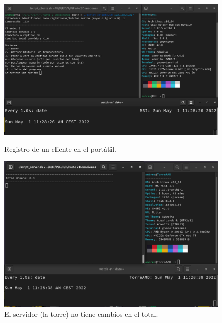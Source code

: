 \documentclass{article}
\begin{document}
\begin{figure}[H]
    \centering
    \begin{minipage}[H]{0.49\textwidth}
        \centering
        \includegraphics[width=\textwidth]{imagenes/multiples ordenadores/Cliente/Screenshot from 2022-05-01 11-29-01.png}
        \caption{Registro de un cliente en el portátil.}
    \end{minipage}
    \hfill
    \begin{minipage}[H]{0.49\textwidth}
        \centering
        \includegraphics[width=\textwidth]{imagenes/multiples ordenadores/Servidor/Screenshot from 2022-05-01 11-29-01.png}
        \caption{El servidor (la torre) no tiene cambios en el total.}
    \end{minipage}
\end{figure}
\end{document}
